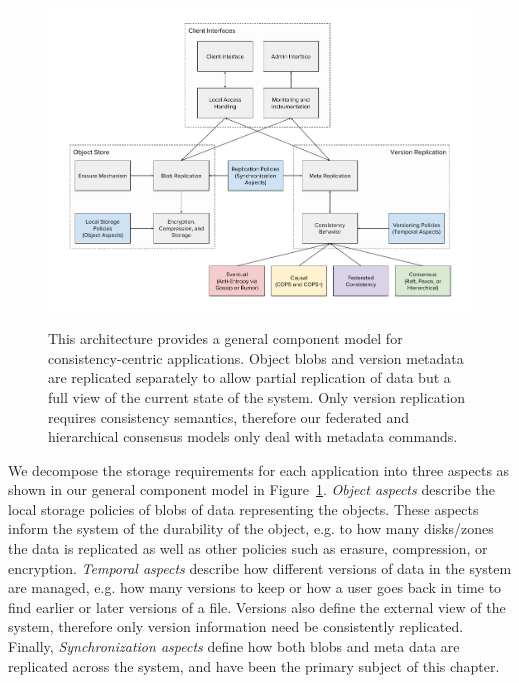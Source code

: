 \begin{figure}
    \begin{center}
        \includegraphics[width=\linewidth]{figures/ch05_fluidfs_components.pdf}
    \end{center}
    \renewcommand{\baselinestretch}{1}
    \small\normalsize

    \begin{quote}
        \caption[Application Component Model]{This architecture provides a general component model for consistency-centric applications. Object blobs and version metadata are replicated separately to allow partial replication of data but a full view of the current state of the system. Only version replication requires consistency semantics, therefore our federated and hierarchical consensus models only deal with metadata commands.}
        \label{fig:ch05_fluidfs_components}
    \end{quote}
\end{figure}
\renewcommand{\baselinestretch}{2}
\small\normalsize

We decompose the storage requirements for each application into three aspects as shown in our general component model in Figure~\ref{fig:ch05_fluidfs_components}.
\emph{Object aspects} describe the local storage policies of blobs of data representing the objects.
These aspects inform the system of the durability of the object, e.g. to how many disks/zones the data is replicated as well as other policies such as erasure, compression, or encryption.
\emph{Temporal aspects} describe how different versions of data in the system are managed, e.g. how many versions to keep or how a user goes back in time to find earlier or later versions of a file.
Versions also define the external view of the system, therefore only version information need be consistently replicated.
Finally, \emph{Synchronization aspects} define how both blobs and meta data are replicated across the system, and have been the primary subject of this chapter.

